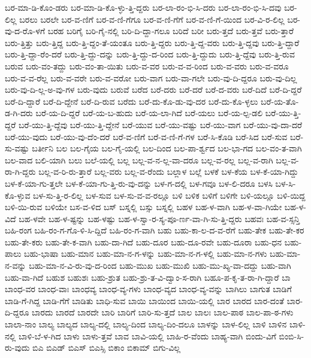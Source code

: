 {ಬರ-ಮಾ-ಡಿ-ಕೊಂ-ಡರು
ಬರ-ಮಾ-ಡಿ-ಕೊ-ಳ್ಳು-ತ್ತಿ-ದ್ದರು
ಬರ-ಲಾ-ರಂ-ಭಿ-ಸಿ-ದರು
ಬರ-ಲಾ-ರಂ-ಭಿ-ಸಿ-ದವು
ಬರ-ಲಿಲ್ಲ
ಬರಲು
ಬರಲೇ
ಬರ-ವ-ಣಿಗೆ
ಬರ-ವ-ಣಿ-ಗೆಗೂ
ಬರ-ವ-ಣಿ-ಗೆಗೆ
ಬರ-ವ-ಣಿ-ಗೆ-ಯಿಂದ
ಬರ-ವಿ-ರ-ಲಿಲ್ಲ
ಬರ-ವು-ದ-ರೊ-ಳಗೆ
ಬರಹ
ಬರಿಗೈ
ಬರಿ-ಗೈ-ನಲ್ಲಿ
ಬರಿ-ದಿ-ದ್ದಾ-ಗಲೂ
ಬರಿದೆ
ಬರೀ
ಬರು-ತ್ತದೆ
ಬರು-ತ್ತವೆ
ಬರು-ತ್ತಾರೆ
ಬರು-ತ್ತಿತ್ತು
ಬರು-ತ್ತಿದ್ದ
ಬರು-ತ್ತಿ-ದ್ದಂ-ತೆ-ಯಂತೂ
ಬರು-ತ್ತಿ-ದ್ದರು
ಬರು-ತ್ತಿ-ದ್ದ-ವರು
ಬರು-ತ್ತಿ-ದ್ದವು
ಬರು-ತ್ತಿ-ದ್ದಾರೆ
ಬರು-ತ್ತಿ-ದ್ದಾ-ರೆಂ-ದರೆ
ಬರು-ತ್ತಿ-ದ್ದು-ದನ್ನು
ಬರು-ತ್ತಿ-ದ್ದು-ದ-ರಿಂದ
ಬರು-ತ್ತಿ-ದ್ದುದು
ಬರು-ತ್ತಿ-ದ್ದೆವು
ಬರು-ತ್ತಿ-ರುವ
ಬರುವ
ಬರು-ವಂ-ತದ್ದು
ಬರು-ವಂ-ತಾ-ಯಿತು
ಬರು-ವ-ವರ
ಬರು-ವ-ವ-ರಿಂದ
ಬರು-ವ-ವರು
ಬರು-ವ-ವರೂ
ಬರು-ವ-ವ-ರೆಲ್ಲ
ಬರು-ವ-ವರೇ
ಬರು-ವ-ವರೋ
ಬರು-ವಾಗ
ಬರು-ವಾ-ಗಲೇ
ಬರು-ವು-ದಿ-ದ್ದರೂ
ಬರು-ವು-ದಿಲ್ಲ
ಬರು-ವು-ದಿ-ಲ್ಲ-ಅ-ವು-ಗಳ
ಬರು-ವುದು
ಬರುವೆ
ಬರೆದ
ಬರೆ-ದರು
ಬರೆ-ದರೆ
ಬರೆ-ದ-ವರು
ಬರೆ-ದಿದೆ
ಬರೆ-ದಿ-ದ್ದರೆ
ಬರೆ-ದಿ-ದ್ದಾರೆ
ಬರೆ-ದಿ-ದ್ದೇನೆ
ಬರೆ-ದಿ-ರುವ
ಬರೆದು
ಬರೆ-ದು-ಕೊ-ಡು-ವು-ದರ
ಬರೆ-ದು-ಕೊ-ಳ್ಳಲು
ಬರೆ-ಯ-ತೊ-ಡ-ಗಿ-ದರು
ಬರೆ-ಯ-ದಿ-ದ್ದರೆ
ಬರೆ-ಯ-ಬ-ಹುದು
ಬರೆ-ಯ-ಲಾ-ಗಿದೆ
ಬರೆ-ಯಲು
ಬರೆ-ಯ-ಲ್ಪ-ಡಲಿ
ಬರೆ-ಯು-ತ್ತಿ-ದ್ದರೆ
ಬರೆ-ಯು-ತ್ತಿ-ದ್ದೆವು
ಬರೆ-ಯು-ತ್ತಿ-ದ್ದೇನೆ
ಬರೆ-ಯುವ
ಬರೆ-ಯು-ವಷ್ಟು
ಬರೆ-ಯು-ವಾಗ
ಬರೆ-ಯು-ವು-ದಾ-ದರೆ
ಬರೆ-ಯು-ವುದು
ಬರೆ-ಯು-ವು-ದೆಂ-ದರೆ
ಬರೆ-ವ-ಣಿಗೆ
ಬರೆ-ವ-ಣಿ-ಗೆ-ಗಳ
ಬರೆ-ಸಿ-ಕೊಡಿ
ಬರೆ-ಸಿದ
ಬರೆ-ಸುವ
ಬರೆ-ಸು-ವಷ್ಟು
ಬರ್ತೀನಿ
ಬಲ
ಬಲ-ಗೈಯ
ಬಲ-ಗೈ-ಯಲ್ಲಿ
ಬಲ-ದಿಂದ
ಬಲ-ಪಾ-ರ್ಶ್ವದ
ಬಲ-ಭಾ-ಗದ
ಬಲ-ವಂ-ತ-ವಾಗಿ
ಬಲ-ವಾದ
ಬಲಿ-ಯಾಗಿ
ಬಲು
ಬಲೆ-ಯಲ್ಲಿ
ಬಲ್ಲ
ಬಲ್ಲ-ವ-ನ-ಲ್ಲ-ವಾ-ದರೂ
ಬಲ್ಲ-ವ-ರಲ್ಲ
ಬಲ್ಲ-ವ-ರಾಗಿ
ಬಲ್ಲ-ವ-ರಾ-ಗಿ-ದ್ದರು
ಬಲ್ಲ-ವ-ರಿ-ರು-ತ್ತಾರೆ
ಬಲ್ಲ-ವರು
ಬಲ್ಲ-ವ-ರೆಂದು
ಬಲ್ಲಾಳ
ಬಲ್ಲೆ
ಬಳಕೆ
ಬಳ-ಕೆಯ
ಬಳ-ಕೆ-ಯಾ-ಗಿದ್ದು
ಬಳ-ಕೆ-ಯಾ-ಗು-ತ್ತಲೇ
ಬಳ-ಕೆ-ಯಾ-ಗು-ತ್ತಿ-ರು-ವು-ದನ್ನು
ಬಳ-ಗ-ದಲ್ಲಿ
ಬಳ-ಗವೂ
ಬಳ-ಲಿ-ದರೂ
ಬಳಸಿ
ಬಳ-ಸಿ-ಕೊ-ಳ್ಳುವ
ಬಳ-ಸು-ತ್ತಿ-ರ-ಲಿಲ್ಲ
ಬಳ-ಸುವ
ಬಳ-ಸು-ವ-ವ-ರಲ್ಲೂ
ಬಳಿ
ಬಳಿಕ
ಬಳಿಗೆ
ಬಳಿಗೇ
ಬಳಿ-ಯಲ್ಲೂ
ಬಳಿ-ಯಿದ್ದ
ಬಳಿ-ಯಿ-ರುವ
ಬಳಿಯೇ
ಬಸ-ವ-ಳಿದ
ಬಸ್
ಬಸ್ನಲ್ಲಿ
ಬಸ್ಸು
ಬಸ್ನಲ್ಲಿ
ಬಹಳ
ಬಹ-ಳ-ವಾಗಿ
ಬಹ-ಳ-ವಾ-ಗಿಯೇ
ಬಹ-ಳ-ವಿದೆ
ಬಹ-ಳವೇ
ಬಹ-ಳ-ಷ್ಟನ್ನು
ಬಹ-ಳಷ್ಟು
ಬಹ-ಳ-ಸ್ವಾ-ರ-ಸ್ಯ-ಪೂ-ರ್ಣ-ವಾ-ಗಿ-ಸು-ತ್ತಿ-ದ್ದರು
ಬಹವಃ
ಬಹ-ವ-ಸ್ಸನ್ತಿ
ಬಹಿ-ರಂಗ
ಬಹಿ-ರಂ-ಗ-ಗೊ-ಳಿ-ಸಿ-ದ್ದಿದೆ
ಬಹಿ-ರಂ-ಗ-ವಾಗಿ
ಬಹು
ಬಹು-ಕಾ-ಲ-ದ-ವ-ರೆಗೆ
ಬಹು-ತೇಕ
ಬಹು-ತೇ-ಕರ
ಬಹು-ತೇ-ಕರು
ಬಹು-ತೇ-ಕ-ವಾಗಿ
ಬಹು-ದಾ-ಗಿದೆ
ಬಹು-ದೂರ
ಬಹು-ದೂ-ರವೇ
ಬಹು-ದೂರಾ
ಬಹು-ಧನ
ಬಹು-ಪಾಲು
ಬಹು-ಭಾಷಾ
ಬಹು-ಮಾನ
ಬಹು-ಮಾ-ನ-ಗ-ಳನ್ನು
ಬಹು-ಮಾ-ನ-ಗ-ಳಲ್ಲಿ
ಬಹು-ಮಾ-ನ-ಗಳು
ಬಹು-ಮಾ-ನ-ವನ್ನು
ಬಹು-ಮಾ-ನ-ವಿ-ರು-ವು-ದ-ರಿಂದ
ಬಹು-ಮುಖ
ಬಹು-ಮುಖಿ
ಬಹು-ಮು-ಖ್ಯ-ವಾ-ದದ್ದು
ಬಹು-ವಾಗಿ
ಬಹು-ವಾ-ಗಿದೆ
ಬಹುಶ
ಬಹುಶಃ
ಬಹು-ಶ್ರುತ
ಬಹು-ಶ್ರು-ತ-ವಿ-ದ್ವಾಂ-ಸ-ರಾಗಿ
ಬಹೂ-ಪ-ಕೃ-ತ-ರಾ-ಗಿ-ದ್ದಾರೆ
ಬಾ
ಬಾಂಧ-ವರ
ಬಾಂಧ-ವಾಃ
ಬಾಂಧವ್ಯ
ಬಾಂಧ-ವ್ಯ-ಗಳು
ಬಾಂಧ-ವ್ಯದ
ಬಾಂಧ-ವ್ಯ-ವನ್ನು
ಬಾಗಿಲು
ಬಾಗುತ
ಬಾಡಿಗೆ
ಬಾಡಿ-ಗೆ-ಗಿದ್ದ
ಬಾಡಿ-ಗೆಗೆ
ಬಾಡಿತು
ಬಾಧಿ-ಸುವ
ಬಾಯಿ
ಬಾಯಿಂದ
ಬಾಯಿ-ಯಲ್ಲಿ
ಬಾರ
ಬಾರದ
ಬಾರ-ದಂತೆ
ಬಾರ-ದಿ-ದ್ದರೂ
ಬಾರದು
ಬಾರದೆ
ಬಾರದೇ
ಬಾರಿ
ಬಾರಿಗೆ
ಬಾರಿ-ಸು-ತ್ತದೆ
ಬಾಲ
ಬಾಲಃ
ಬಾಲ-ಪಾಠ
ಬಾಲ-ಪಾ-ಠ-ಗಳು
ಬಾಲಾ-ನಾಂ
ಬಾಲ್ಯ
ಬಾಲ್ಯದ
ಬಾಲ್ಯ-ದಲ್ಲಿ
ಬಾಲ್ಯ-ದಿಂದ
ಬಾಲ್ಯ-ದಿಂ-ದಲೂ
ಬಾಳನ್ನು
ಬಾಳ-ಲಿಲ್ಲ
ಬಾಳಿ
ಬಾಳಿನ
ಬಾಳಿ-ನಲ್ಲಿ
ಬಾಳಿ-ಬೆ-ಳ-ಗಿದ
ಬಾಳು
ಬಾಳು-ತ್ತವೆ
ಬಾವ
ಬಾವಿ-ಯಲ್ಲಿ
ಬಾಹಿ-ರ-ವೆಂದು
ಬಾಹ್ಯ-ವಾಗಿ
ಬಿಂದು-ವಿಗೆ
ಬಿಂಬಿ-ಸಿ-ರು-ವುದು
ಬಿಎ
ಬಿಎಡ್
ಬಿಎಸ್
ಬಿಎಸ್ಸಿ
ಬಿಕಾಂ
ಬಿಕಾಮ್
ಬಿಗು-ವಿಲ್ಲ
}
